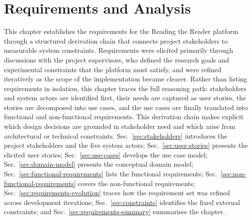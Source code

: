 \chapter{Requirements and Analysis}
\label{ch:requirements}

This chapter establishes the requirements for the Reading the Reader platform through a structured derivation chain that connects project stakeholders to measurable system constraints.
Requirements were elicited primarily through discussions with the project supervisors, who defined the research goals and experimental constraints that the platform must satisfy, and were refined iteratively as the scope of the implementation became clearer.
Rather than listing requirements in isolation, this chapter traces the full reasoning path: stakeholders and system actors are identified first, their needs are captured as user stories, the stories are decomposed into use cases, and the use cases are finally translated into functional and non-functional requirements.
This derivation chain makes explicit which design decisions are grounded in stakeholder need and which arise from architectural or technical constraints.
Sec.~\ref{sec:stakeholders} introduces the project stakeholders and the five system actors; Sec.~\ref{sec:user-stories} presents the elicited user stories; Sec.~\ref{sec:use-cases} develops the use case model; Sec.~\ref{sec:domain-model} presents the conceptual domain model; Sec.~\ref{sec:functional-requirements} lists the functional requirements; Sec.~\ref{sec:non-functional-requirements} covers the non-functional requirements; Sec.~\ref{sec:requirements-evolution} traces how the requirement set was refined across development iterations; Sec.~\ref{sec:constraints} identifies the fixed external constraints; and Sec.~\ref{sec:requirements-summary} summarises the chapter.











